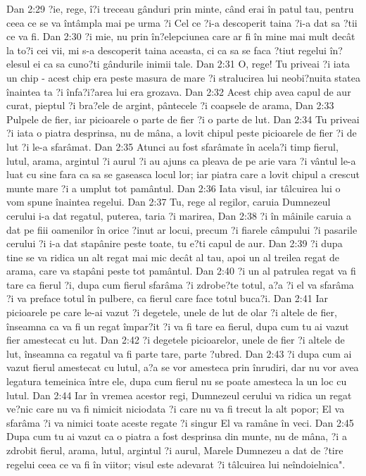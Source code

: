 Dan 2:29  ?ie, rege, î?i treceau gânduri prin minte, când erai în patul tau, pentru ceea ce se va întâmpla mai pe urma ?i Cel ce ?i-a descoperit taina ?i-a dat sa ?tii ce va fi.
Dan 2:30  ?i mie, nu prin în?elepciunea care ar fi în mine mai mult decât la to?i cei vii, mi s-a descoperit taina aceasta, ci ca sa se faca ?tiut regelui în?elesul ei ca sa cuno?ti gândurile inimii tale.
Dan 2:31  O, rege! Tu priveai ?i iata un chip - acest chip era peste masura de mare ?i stralucirea lui neobi?nuita statea înaintea ta ?i înfa?i?area lui era grozava.
Dan 2:32  Acest chip avea capul de aur curat, pieptul ?i bra?ele de argint, pântecele ?i coapsele de arama,
Dan 2:33  Pulpele de fier, iar picioarele o parte de fier ?i o parte de lut.
Dan 2:34  Tu priveai ?i iata o piatra desprinsa, nu de mâna, a lovit chipul peste picioarele de fier ?i de lut ?i le-a sfarâmat.
Dan 2:35  Atunci au fost sfarâmate în acela?i timp fierul, lutul, arama, argintul ?i aurul ?i au ajuns ca pleava de pe arie vara ?i vântul le-a luat cu sine fara ca sa se gaseasca locul lor; iar piatra care a lovit chipul a crescut munte mare ?i a umplut tot pamântul.
Dan 2:36  Iata visul, iar tâlcuirea lui o vom spune înaintea regelui.
Dan 2:37  Tu, rege al regilor, caruia Dumnezeul cerului i-a dat regatul, puterea, taria ?i marirea,
Dan 2:38  ?i în mâinile caruia a dat pe fiii oamenilor în orice ?inut ar locui, precum ?i fiarele câmpului ?i pasarile cerului ?i i-a dat stapânire peste toate, tu e?ti capul de aur.
Dan 2:39  ?i dupa tine se va ridica un alt regat mai mic decât al tau, apoi un al treilea regat de arama, care va stapâni peste tot pamântul.
Dan 2:40  ?i un al patrulea regat va fi tare ca fierul ?i, dupa cum fierul sfarâma ?i zdrobe?te totul, a?a ?i el va sfarâma ?i va preface totul în pulbere, ca fierul care face totul buca?i.
Dan 2:41  Iar picioarele pe care le-ai vazut ?i degetele, unele de lut de olar ?i altele de fier, înseamna ca va fi un regat împar?it ?i va fi tare ea fierul, dupa cum tu ai vazut fier amestecat cu lut.
Dan 2:42  ?i degetele picioarelor, unele de fier ?i altele de lut, înseamna ca regatul va fi parte tare, parte ?ubred.
Dan 2:43  ?i dupa cum ai vazut fierul amestecat cu lutul, a?a se vor amesteca prin înrudiri, dar nu vor avea legatura temeinica între ele, dupa cum fierul nu se poate amesteca la un loc cu lutul.
Dan 2:44  Iar în vremea acestor regi, Dumnezeul cerului va ridica un regat ve?nic care nu va fi nimicit niciodata ?i care nu va fi trecut la alt popor; El va sfarâma ?i va nimici toate aceste regate ?i singur El va ramâne în veci.
Dan 2:45  Dupa cum tu ai vazut ca o piatra a fost desprinsa din munte, nu de mâna, ?i a zdrobit fierul, arama, lutul, argintul ?i aurul, Marele Dumnezeu a dat de ?tire regelui ceea ce va fi în viitor; visul este adevarat ?i tâlcuirea lui neîndoielnica".

